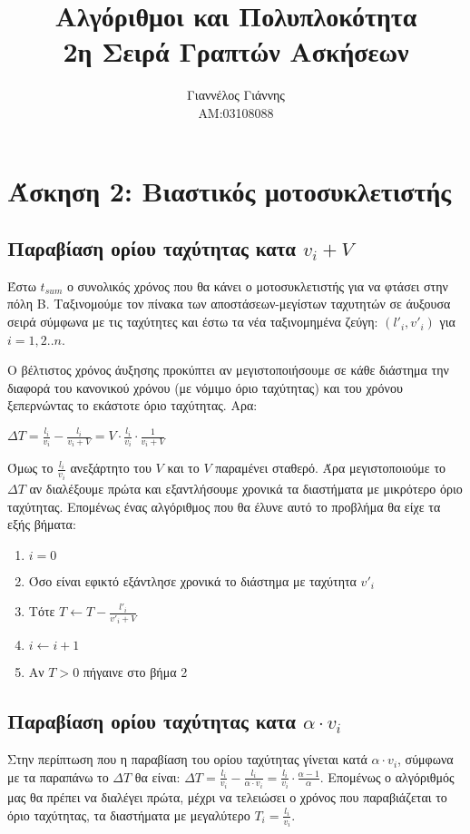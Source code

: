 \documentclass[a4paper,12pt]{report}
\title{ Αλγόριθμοι και Πολυπλοκότητα \\ 2η Σειρά Γραπτών Ασκήσεων}
\author{Γιαννέλος Γιάννης\\ΑΜ:03108088}
\begin{document}
\maketitle

\section*{Άσκηση 2: Βιαστικός μοτοσυκλετιστής}
\subsection*{Παραβίαση ορίου ταχύτητας κατα $v_i+V$}
Έστω $t_{sum}$ ο συνολικός χρόνος που θα κάνει ο μοτοσυκλετιστής για να φτάσει στην πόλη Β. Ταξινομούμε τον πίνακα των αποστάσεων-μεγίστων ταχυτητών σε άυξουσα σειρά σύμφωνα με τις ταχύτητες και έστω τα νέα ταξινομημένα ζεύγη: $(l'_i,v'_i)$ για $i=1,2..n$.

Ο βέλτιστος χρόνος άυξησης προκύπτει αν μεγιστοποιήσουμε σε κάθε διάστημα την διαφορά του κανονικού χρόνου (με νόμιμο όριο ταχύτητας) και του χρόνου ξεπερνώντας το εκάστοτε όριο ταχύτητας. Αρα:
\begin{center}
$\Delta T = \frac{l_i}{v_i} - \frac{l_i}{v_i+V} = V \cdot \frac{l_i}{v_i} \cdot \frac{1}{v_i+V}$
\end{center}
Όμως το $\frac{l_i}{v_i}$ ανεξάρτητο του $V$ και το $V$ παραμένει σταθερό. Άρα μεγιστοποιούμε το $\Delta T$ αν διαλέξουμε πρώτα και εξαντλήσουμε χρονικά τα διαστήματα με μικρότερο όριο ταχύτητας. Επομένως ένας αλγόριθμος που θα έλυνε αυτό το προβλήμα θα είχε τα εξής βήματα:
\begin{enumerate}
 \item $i=0$
 \item Όσο είναι εφικτό εξάντλησε χρονικά το διάστημα με ταχύτητα $v'_i$
 \item Τότε $T \gets T-\frac{l'_i}{v'_i+V}$
 \item $i \gets i+1$
 \item Αν $T>0$ πήγαινε στο βήμα 2
\end{enumerate}

\subsection*{Παραβίαση ορίου ταχύτητας κατα $\alpha \cdot v_i$}
Στην περίπτωση που η παραβίαση του ορίου ταχύτητας γίνεται κατά $\alpha \cdot v_i$, σύμφωνα με τα παραπάνω το $\Delta T$ θα είναι: $\Delta T = \frac{l_i}{v_i} - \frac{l_i}{\alpha \cdot v_i} = \frac{l_i}{v_i} \cdot \frac{\alpha-1}{\alpha}$. Επομένως ο αλγόριθμός μας θα πρέπει να διαλέγει πρώτα, μέχρι να τελειώσει ο χρόνος που παραβιάζεται το όριο ταχύτητας, τα διαστήματα με μεγαλύτερο $T_i=\frac{l_i}{v_i}$.     
\end{document}
